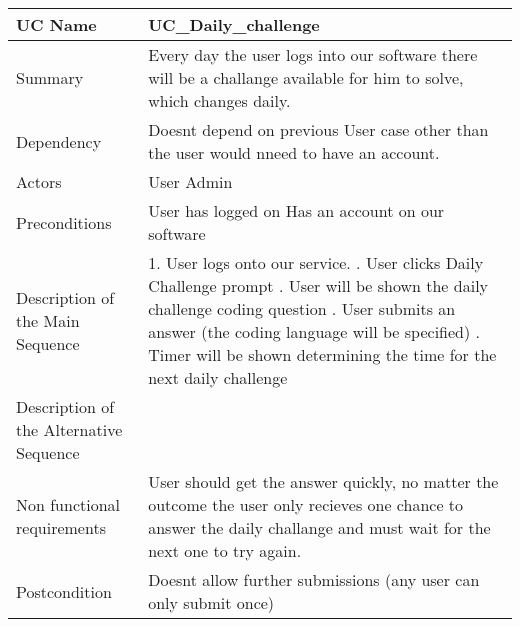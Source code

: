 \begin{table}[htbp]
\centering
\begin{tabularx}{\textwidth}{|l|X|}
\hline
UC Name & UC\_Daily\_challenge \\ \hline

Summary &  Every day the user logs into our software there will be a challange available for him to solve, which changes daily. \\ \hline

Dependency & Doesnt depend on previous User case other than the user would nneed to have an account. \\ \hline

Actors & User \newline Admin \\ \hline

Preconditions & \-User has logged on \newline \-Has an account on our software \\ \hline

Description of the Main Sequence & 1.	User logs onto our service.  \newline  2.	User clicks Daily Challenge prompt \newline 3.	User will be shown the daily challenge coding question  \newline4.	User submits an answer (the coding language will be specified) \newline5.	Timer will be shown determining the time for the next daily challenge \\ \hline

Description of the Alternative Sequence & \- \\ \hline

Non functional requirements & User should get the answer quickly, no matter the outcome the user only recieves one chance to answer the daily challange and must wait for the next one to try again. \\ \hline

Postcondition & Doesnt allow further submissions (any user can only submit once) \\ \hline

\end{tabularx}
\end{table}


